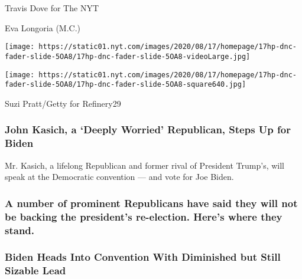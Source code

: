  Travis Dove for The NYT

Eva Longoria (M.C.)

\texttt{[image: https://static01.nyt.com/images/2020/08/17/homepage/17hp-dnc-fader-slide-5OA8/17hp-dnc-fader-slide-5OA8-videoLarge.jpg]}

\texttt{[image: https://static01.nyt.com/images/2020/08/17/homepage/17hp-dnc-fader-slide-5OA8/17hp-dnc-fader-slide-5OA8-square640.jpg]}

 Suzi Pratt/Getty for Refinery29

\href{https://www.nytimes.com/2020/08/17/us/politics/john-kasich-biden.html}{}

\hypertarget{john-kasich-a-deeply-worried-republican-steps-up-for-biden}{%
\subsubsection{John Kasich, a `Deeply Worried' Republican, Steps Up for
Biden}\label{john-kasich-a-deeply-worried-republican-steps-up-for-biden}}

\href{https://www.nytimes.com/2020/08/17/us/politics/john-kasich-biden.html}{}

Mr. Kasich, a lifelong Republican and former rival of President Trump's,
will speak at the Democratic convention --- and vote for Joe Biden.

\href{https://www.nytimes.com/article/republicans-voting-for-biden-not-trump.html}{}

\hypertarget{a-number-of-prominent-republicans-have-said-they-will-not-be-backing-the-presidents-re-election-heres-where-they-stand}{%
\subsubsection{A number of prominent Republicans have said they will not
be backing the president's re-election. Here's where they
stand.}\label{a-number-of-prominent-republicans-have-said-they-will-not-be-backing-the-presidents-re-election-heres-where-they-stand}}

\href{https://www.nytimes.com/2020/08/17/upshot/polls-2020-election-convention.html}{}

\hypertarget{biden-heads-into-convention-with-diminished-but-still-sizable-lead}{%
\subsubsection{Biden Heads Into Convention With Diminished but Still
Sizable
Lead}\label{biden-heads-into-convention-with-diminished-but-still-sizable-lead}}

